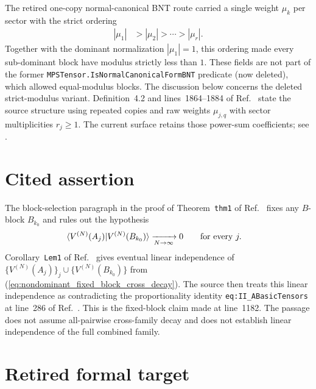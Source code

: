 \documentclass{article}
\begin{document}
The retired one-copy normal-canonical BNT route carried a single weight
$\mu_k$ per sector with the strict ordering
\begin{align}
    |\mu_1|
        &>|\mu_2|>\cdots>|\mu_r|.
    \label{eq:nondominant_strict_weight_order}
\end{align}
Together with the dominant normalization $|\mu_1|=1$, this ordering made every
sub-dominant block have modulus strictly less than $1$. These fields are not
part of the former \texttt{MPSTensor.IsNormalCanonicalFormBNT} predicate (now
deleted), which allowed equal-modulus blocks. The discussion below concerns the deleted strict-modulus
variant. Definition~4.2 and lines~1864--1884 of
Ref.~\cite{Cirac2021Matrix} state the source structure using repeated copies
and raw weights $\mu_{j,q}$ with sector multiplicities $r_j\geq 1$. The current
 surface retains those power-sum coefficients; see
.

\section{Cited assertion}

The block-selection paragraph in the proof of Theorem~\texttt{thm1} of
Ref.~\cite[line~1182]{Cirac2016MPDO_arXiv} fixes any $B$-block $B_{k_0}$ and
rules out the hypothesis
\begin{align}
    \langle V^{(N)}(A_j) | V^{(N)}(B_{k_0}) \rangle
        &\xrightarrow[N\to\infty]{}0
        \qquad\text{for every }j.
    \label{eq:nondominant_fixed_block_cross_decay}
\end{align}
Corollary~\texttt{Lem1} of
Ref.~\cite[line~1131]{Cirac2016MPDO_arXiv} gives eventual linear independence
of $\{V^{(N)}(A_j)\}_j\cup\{V^{(N)}(B_{k_0})\}$ from
(\ref{eq:nondominant_fixed_block_cross_decay}). The source then treats this
linear independence as contradicting the proportionality identity
\texttt{eq:II\_ABasicTensors} at line~286 of
Ref.~\cite{Cirac2016MPDO_arXiv}. This is the fixed-block claim made at
line~1182. The passage does not assume all-pairwise cross-family decay and does
not establish linear independence of the full combined family.

\section{Retired formal target}
\end{document}

